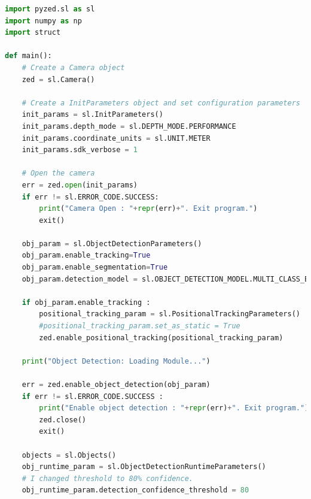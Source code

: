 \documentclass{l4proj}
\begin{document}
\begin{lstlisting}[language=python, float, caption={Python Vehicle Detection Code Part 1, Original Code Without Edits Copyright (c) 2022, STEREOLABS.}, label={lst:code1}]
import pyzed.sl as sl
import numpy as np
import struct

def main():
    # Create a Camera object
    zed = sl.Camera()

    # Create a InitParameters object and set configuration parameters
    init_params = sl.InitParameters()
    init_params.depth_mode = sl.DEPTH_MODE.PERFORMANCE
    init_params.coordinate_units = sl.UNIT.METER
    init_params.sdk_verbose = 1

    # Open the camera
    err = zed.open(init_params)
    if err != sl.ERROR_CODE.SUCCESS:
        print("Camera Open : "+repr(err)+". Exit program.")
        exit()

    obj_param = sl.ObjectDetectionParameters()
    obj_param.enable_tracking=True
    obj_param.enable_segmentation=True
    obj_param.detection_model = sl.OBJECT_DETECTION_MODEL.MULTI_CLASS_BOX_MEDIUM

    if obj_param.enable_tracking :
        positional_tracking_param = sl.PositionalTrackingParameters()
        #positional_tracking_param.set_as_static = True
        zed.enable_positional_tracking(positional_tracking_param)

    print("Object Detection: Loading Module...")

    err = zed.enable_object_detection(obj_param)
    if err != sl.ERROR_CODE.SUCCESS :
        print("Enable object detection : "+repr(err)+". Exit program.")
        zed.close()
        exit()

    objects = sl.Objects()
    obj_runtime_param = sl.ObjectDetectionRuntimeParameters()
    # I changed threshold to 80% confidence.
    obj_runtime_param.detection_confidence_threshold = 80
\end{lstlisting}
\end{document}

